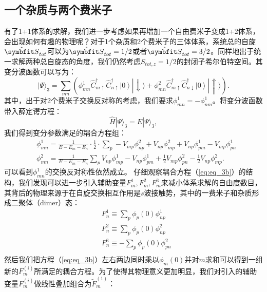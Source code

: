 \subsection{一个杂质与两个费米子}
有了1+1体系的求解，我们进一步考虑如果再增加一个自由费米子变成1+2体系，会出现如何有趣的物理呢？对于1个杂质和2个费米子的三体体系，系统总的自旋$\hat{\Vector{S}}_{tot}$可以为$\hat{\Vector{S}}_{tot}=1/2$或者$\hat{\Vector{S}}_{tot}=3/2$。同样地出于统一求解两种总自旋态的角度，我们仍然考虑$S_{tot,z}=1/2$的封闭子希尔伯特空间。其变分波函数可以写为：
\begin{equation}\label{eq:wv3}
    |\Psi\rangle_3 = \sum_{mn} \left( \phi^1_{mn} \hat{C}_{m\uparrow}^\dagger \hat{C}_{n\uparrow}^\dagger \left|0\right> |\Downarrow\rangle + \phi^2_{mn}  \hat{C}_{m\uparrow}^\dagger \hat{C}_{n\downarrow}^\dagger \left|0\right> |\Uparrow\rangle \right).
\end{equation}
其中，出于对2个费米子交换反对称的考虑，我们要求$\phi^1_{mn} = -\phi^1_{nm}$。将变分波函数带入薛定谔方程：
\begin{equation}
  \hat{H} |\Psi \rangle_3 = E |\Psi\rangle_3,
\end{equation}
我们得到变分参数满足的耦合方程组：
\begin{equation}
    \begin{split}
        &\phi^1_{mn} = \frac{1}{E-E_m-E_n} \cdot \frac{1}{2} \cdot  \sum_{p}-V_{mp}\phi^2_{np}+V_{np}\phi^2_{mp} +V_{np}\phi^1_{pm}- V_{mp}\phi^1_{pn} \\
        &\phi^2_{mn} = \frac{1}{E-E_m-E_n} \sum_p V_{np}\phi^1_{mp}-V_{np}\phi^1_{pm}+ \frac{1}{2} V_{mp}\phi^2_{pn}- \frac{1}{2}V_{np}\phi^2_{mp}.
    \end{split}\label{eq:eq_3b}
\end{equation} 
可以看到$\phi^1_{mn}$的交换反对称性依然成立。
仔细观察耦合方程（\ref{eq:eq_3b}）的结构，我们发现可以进一步引入辅助变量$F^1_m,F^2_m,F^3_m$来减小体系求解的自由度数目，其背后的物理来源于在自旋交换相互作用是$s$波接触势，其中的一费米子和杂质形成二聚体（dimer）态：
    \begin{equation}
        \begin{split}
        &F^1_n \equiv \sum_p\phi_p(0)\phi^1_{np} \\
        &F^2_n \equiv \sum_p\phi_p(0)\phi^2_{np} \\
        &F^3_n \equiv -\sum_p\phi_p(0)\phi^2_{pn}\\
        \end{split} \label{F}
    \end{equation}
然后我们把方程（\ref{eq:eq_3b}）左右两边同时乘以$\phi_m(0)$并对$m$求和可以得到一组新的$F^(i)_m$所满足的耦合方程。为了使得其物理意义更加明显，我们对引入的辅助变量$F^(i)_m$做线性叠加组合为$\tilde{F}^{(1)}_m$：
